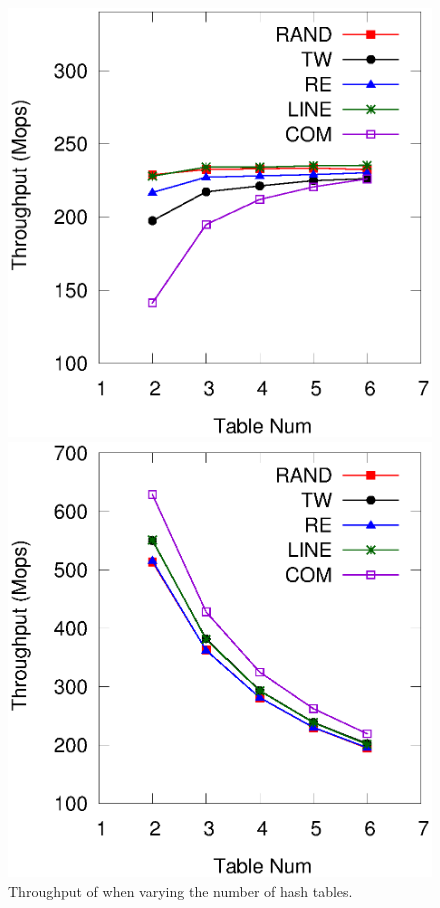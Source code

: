 \begin{figure}[h]
\begin{minipage}{0.48\linewidth}\centering
	\includegraphics[width=\linewidth]{pic/tunning/tunning-insert.eps}
	\centerline{}
	\end{minipage}
	\hfill
	\begin{minipage}{0.48\linewidth}\centering
	\includegraphics[width=\linewidth]{pic/tunning/tunning-search.eps}
	\centerline{}
	\end{minipage}
	\caption{Throughput of \voter when varying the number of hash tables.}
	\label{fig:vary-table}
\end{figure}

